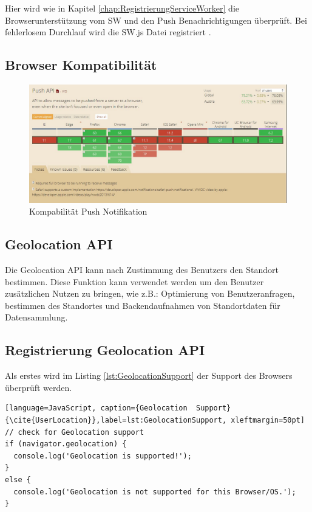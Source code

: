 Hier wird wie in Kapitel \ref{chap:RegistrierungServiceWorker} die Browserunterstützung vom \acs{SW} und den Push Benachrichtigungen überprüft. Bei fehlerlosem Durchlauf wird die \acs{SW}.js Datei registriert \cite{PushNotifikation}.
\newpage
\subsection{Browser Kompatibilität}
\begin{figure}[h]
	\centering
	\includegraphics[width=14cm]{BilderAllgemein/BrowserPushAPI}\medskip
	\caption{Kompabilität Push Notifikation \cite{BrowserSupport}}
	\label{fig:BrowserPushAPI}
\end{figure}




\newpage
\subsection{Geolocation API}
Die Geolocation API kann nach Zustimmung des Benutzers den Standort bestimmen. Diese Funktion kann verwendet werden um  den Benutzer zusätzlichen Nutzen zu bringen, wie z.B.: Optimierung von Benutzeranfragen, bestimmen des Standortes und Backendaufnahmen von Standortdaten für Datensammlung.

\subsection{Registrierung Geolocation API}
Als erstes wird im Listing \ref{lst:GeolocationSupport}  der Support des Browsers überprüft werden.


\begin{lstlisting}[language=JavaScript, caption={Geolocation  Support} {\cite{UserLocation}},label=lst:GeolocationSupport, xleftmargin=50pt]
// check for Geolocation support
if (navigator.geolocation) {
  console.log('Geolocation is supported!');
}
else {
  console.log('Geolocation is not supported for this Browser/OS.');
}
\end{lstlisting}

